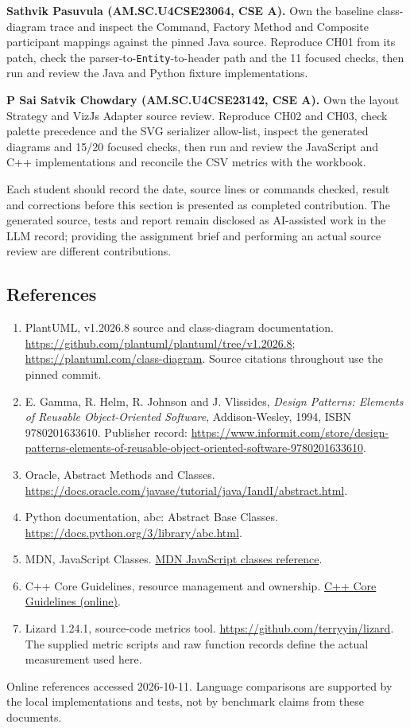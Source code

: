 \documentclass[11pt,a4paper]{article}
\begin{document}
\textbf{Sathvik Pasuvula (AM.SC.U4CSE23064, CSE A).} Own the baseline
class-diagram trace and inspect the Command, Factory Method and Composite
participant mappings against the pinned Java source. Reproduce CH01 from its
patch, check the parser-to-\texttt{Entity}-to-header path and the 11 focused
checks, then run and review the Java and Python fixture implementations.

\textbf{P Sai Satvik Chowdary (AM.SC.U4CSE23142, CSE A).} Own the layout
Strategy and VizJs Adapter source review. Reproduce CH02 and CH03, check
palette precedence and the SVG serializer allow-list, inspect the generated
diagrams and 15/20 focused checks, then run and review the JavaScript and C++
implementations and reconcile the CSV metrics with the workbook.

Each student should record the date, source lines or commands checked, result
and corrections before this section is presented as completed contribution.
The generated source, tests and report remain disclosed as AI-assisted work in
the LLM record; providing the assignment brief and performing an actual source
review are different contributions.

\subsection{References}
\begin{enumerate}
\item PlantUML, v1.2026.8 source and class-diagram documentation.
\url{https://github.com/plantuml/plantuml/tree/v1.2026.8};
\url{https://plantuml.com/class-diagram}. Source citations throughout use the pinned commit.
\item E. Gamma, R. Helm, R. Johnson and J. Vlissides,
\emph{Design Patterns: Elements of Reusable Object-Oriented Software},
Addison-Wesley, 1994, ISBN 9780201633610. Publisher record:
\url{https://www.informit.com/store/design-patterns-elements-of-reusable-object-oriented-software-9780201633610}.
\item Oracle, Abstract Methods and Classes.
\url{https://docs.oracle.com/javase/tutorial/java/IandI/abstract.html}.
\item Python documentation, abc: Abstract Base Classes.
\url{https://docs.python.org/3/library/abc.html}.
\item MDN, JavaScript Classes.
\href{https://developer.mozilla.org/en-US/docs/Web/JavaScript/Reference/Classes}{MDN JavaScript classes reference}.
\item C++ Core Guidelines, resource management and ownership.
\href{https://isocpp.github.io/CppCoreGuidelines/CppCoreGuidelines}{C++ Core Guidelines (online)}.
\item Lizard 1.24.1, source-code metrics tool.
\url{https://github.com/terryyin/lizard}. The supplied metric scripts and raw function
records define the actual measurement used here.
\end{enumerate}
Online references accessed 2026-10-11. Language comparisons are supported by the
local implementations and tests, not by benchmark claims from these documents.
\end{document}
